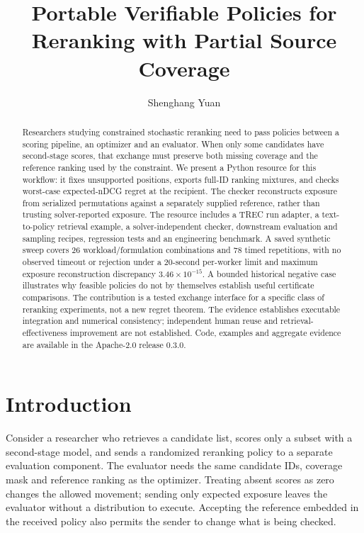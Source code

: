 \documentclass[runningheads]{llncs}
\begin{document}
\title{Portable Verifiable Policies for Reranking with Partial Source Coverage}
\author{Shenghang Yuan}
\maketitle
\begin{abstract}
Researchers studying constrained stochastic reranking need to pass policies
between a scoring pipeline, an optimizer and an evaluator. When only some
candidates have second-stage scores, that exchange must preserve both missing
coverage and the reference ranking used by the constraint. We present a Python
resource for this workflow: it fixes unsupported positions, exports full-ID
ranking mixtures, and checks worst-case expected-nDCG regret at the recipient.
The checker reconstructs exposure from serialized permutations against a
separately supplied reference, rather than trusting solver-reported exposure.
The resource includes a TREC run adapter, a text-to-policy retrieval example,
a solver-independent checker, downstream evaluation and sampling recipes,
regression tests and an engineering benchmark.
A saved synthetic sweep covers 26 workload/formulation combinations and 78
timed repetitions, with no observed timeout or rejection under a 20-second
per-worker limit and maximum exposure reconstruction discrepancy
$3.46\times10^{-15}$. A bounded historical negative case illustrates why
feasible policies do not by themselves establish useful certificate comparisons.
The contribution is a tested exchange interface for a specific class of
reranking experiments, not a new regret theorem. The evidence establishes
executable integration and numerical consistency; independent human reuse
and retrieval-effectiveness improvement are not established. Code, examples
and aggregate evidence are available in the Apache-2.0 release 0.3.0.
\end{abstract}

\section{Introduction}
Consider a researcher who retrieves a candidate list, scores only a subset
with a second-stage model, and sends a randomized reranking policy to a
separate evaluation component. The evaluator needs the same candidate IDs,
coverage mask and reference ranking as the optimizer. Treating absent scores
as zero changes the allowed movement; sending only expected exposure leaves
the evaluator without a distribution to execute. Accepting the reference
embedded in the received policy also permits the sender to change what is
being checked.
\end{document}

